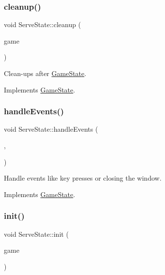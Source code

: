 \subsubsection{\texorpdfstring{cleanup()}{cleanup()}}
{\footnotesize\ttfamily void Serve\+State\+::cleanup (\begin{DoxyParamCaption}\item[{\mbox{\hyperlink{class_game_engine}{Game\+Engine}} $\ast$}]{game }\end{DoxyParamCaption})\hspace{0.3cm}{\ttfamily [virtual]}}



Clean-\/ups after \mbox{\hyperlink{class_game_state}{Game\+State}}. 



Implements \mbox{\hyperlink{class_game_state_a7df4ea0b4815d2b3b35dbec2a399a0b6}{Game\+State}}.

\mbox{\label{class_serve_state_a8f372bdf6b72e8d4ae9eaa1b45a4d844}} 
\subsubsection{\texorpdfstring{handleEvents()}{handleEvents()}}
{\footnotesize\ttfamily void Serve\+State\+::handle\+Events (\begin{DoxyParamCaption}\item[{\mbox{\hyperlink{class_game_engine}{Game\+Engine}} $\ast$}]{,  }\item[{sf\+::\+Event}]{ }\end{DoxyParamCaption})\hspace{0.3cm}{\ttfamily [virtual]}}



Handle events like key presses or closing the window. 



Implements \mbox{\hyperlink{class_game_state_a3ef0638514dbfe71581d593cf0f66ce5}{Game\+State}}.

\mbox{\label{class_serve_state_ab39cdbf8c6fe8bbcf67d29033c3e2c15}} 
\subsubsection{\texorpdfstring{init()}{init()}}
{\footnotesize\ttfamily void Serve\+State\+::init (\begin{DoxyParamCaption}\item[{\mbox{\hyperlink{class_game_engine}{Game\+Engine}} $\ast$}]{game }\end{DoxyParamCaption})\hspace{0.3cm}{\ttfamily [virtual]}}



